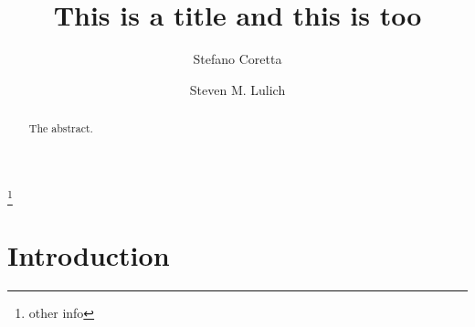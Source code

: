 \documentclass[]{JASAnew}
\begin{document}

\title[A subtitle goes on another line]{This is a title and this is too}



\author{Stefano Coretta}
\thanks{other info}
\author{Steven M. Lulich}







\begin{abstract}
The abstract.
\end{abstract}


\maketitle




\section{Introduction}\label{introduction}
\end{document}
